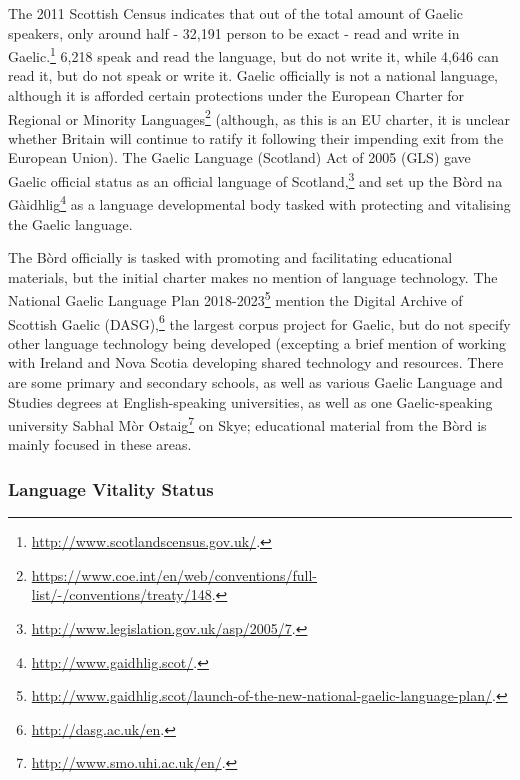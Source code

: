 The 2011 Scottish Census indicates that out of the total amount of Gaelic speakers, only around half - 32,191 person to be exact - read and write in Gaelic.\footnote{\href{http://www.scotlandscensus.gov.uk/}{http://www.scotlandscensus.gov.uk/}. } 6,218 speak and read the language, but do not write it, while 4,646 can read it, but do not speak or write it. Gaelic officially is not a national language, although it is afforded certain protections under the European Charter for Regional or Minority Languages\footnote{\href{https://www.coe.int/en/web/conventions/full-list/-/conventions/treaty/148}{https://www.coe.int/en/web/conventions/full-list/-/conventions/treaty/148}. } (although, as this is an EU charter, it is unclear whether Britain will continue to ratify it following their impending exit from the European Union). The Gaelic Language (Scotland) Act of 2005 (GLS) gave Gaelic official status as an official language of Scotland,\footnote{\href{http://www.legislation.gov.uk/asp/2005/7}{http://www.legislation.gov.uk/asp/2005/7}. } and set up the B\`ord na G\`aidhlig\footnote{\href{http://www.gaidhlig.scot/}{http://www.gaidhlig.scot/}. } as a language developmental body tasked with protecting and vitalising the Gaelic language.

The B\`ord officially is tasked with promoting and facilitating educational materials, but the initial charter makes no mention of language technology. The National Gaelic Language Plan 2018-2023\footnote{\href{http://www.gaidhlig.scot/launch-of-the-new-national-gaelic-language-plan/}{http://www.gaidhlig.scot/launch-of-the-new-national-gaelic-language-plan/}. } \citep{bord2018national} mention the Digital Archive of Scottish Gaelic (DASG),\footnote{\href{http://dasg.ac.uk/en}{http://dasg.ac.uk/en}. } the largest corpus project for Gaelic, but do not specify other language technology being developed (excepting a brief mention of working with Ireland and Nova Scotia developing shared technology and resources. There are some primary and secondary schools, as well as various Gaelic Language and Studies degrees at English-speaking universities, as well as one Gaelic-speaking university Sabhal M\`or Ostaig\footnote{\href{http://www.smo.uhi.ac.uk/en/}{http://www.smo.uhi.ac.uk/en/}. } on Skye; educational material from the B\`ord is mainly focused in these areas.

\subsubsection{Language Vitality Status}
\label{sec:gaelic-vitality-status}

